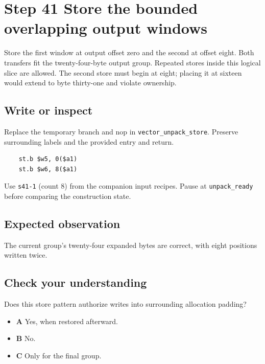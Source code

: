 \section{Step 41 Store the bounded overlapping output windows}\label{rgb-s41}

Store the first window at output offset zero and the second at offset eight. Both transfers fit the twenty-four-byte output group. Repeated stores inside this logical slice are allowed. The second store must begin at eight; placing it at sixteen would extend to byte thirty-one and violate ownership.

\subsection{Write or inspect}
Replace the temporary branch and nop in \texttt{vector\_unpack\_store}. Preserve surrounding labels and the provided entry and return.

\begin{verbatim}
    st.b $w5, 0($a1)
    st.b $w6, 8($a1)
\end{verbatim}
Use \texttt{s41-1} (count 8) from the companion input recipes. Pause at \texttt{unpack\_ready} before comparing the construction state.

\subsection{Expected observation}
The current group's twenty-four expanded bytes are correct, with eight positions written twice.

\subsection{Check your understanding}
Does this store pattern authorize writes into surrounding allocation padding?

\begin{itemize}
  \item \textbf{A} Yes, when restored afterward.
  \item \textbf{B} No.
  \item \textbf{C} Only for the final group.
\end{itemize}
